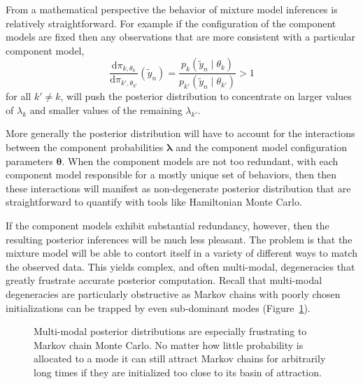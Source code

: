 \documentclass[
  letterpaper,
  DIV=11,
  numbers=noendperiod]{scrartcl}
\begin{document}
From a mathematical perspective the behavior of mixture model inferences
is relatively straightforward. For example if the configuration of the
component models are fixed then any observations that are more
consistent with a particular component model, \[
\frac
{ \mathrm{d} \pi_{k , \theta_{k}}  }
{ \mathrm{d} \pi_{k', \theta_{k'}} } (\tilde{y}_{n})
=
\frac
{ p_{k}(\tilde{y}_{n} \mid \theta_{k}) }
{ p_{k'}(\tilde{y}_{n} \mid \theta_{k'}) }
> 1
\] for all \(k' \ne k\), will push the posterior distribution to
concentrate on larger values of \(\lambda_{k}\) and smaller values of
the remaining \(\lambda_{k'}\).

More generally the posterior distribution will have to account for the
interactions between the component probabilities
\(\boldsymbol{\lambda}\) and the component model configuration
parameters \(\boldsymbol{\theta}\). When the component models are not
too redundant, with each component model responsible for a mostly unique
set of behaviors, then then these interactions will manifest as
non-degenerate posterior distribution that are straightforward to
quantify with tools like Hamiltonian Monte Carlo.

If the component models exhibit substantial redundancy, however, then
the resulting posterior inferences will be much less pleasant. The
problem is that the mixture model will be able to contort itself in a
variety of different ways to match the observed data. This yields
complex, and often multi-modal, degeneracies that greatly frustrate
accurate posterior computation. Recall that multi-modal degeneracies are
particularly obstructive as Markov chains with poorly chosen
initializations can be trapped by even sub-dominant modes
(Figure~\ref{fig-multimodal}).

\begin{figure}


\caption{\label{fig-multimodal}Multi-modal posterior distributions are
especially frustrating to Markov chain Monte Carlo. No matter how little
probability is allocated to a mode it can still attract Markov chains
for arbitrarily long times if they are initialized too close to its
basin of attraction.}

\end{figure}%
\end{document}
